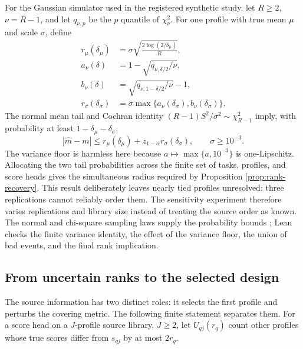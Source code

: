For the Gaussian simulator used in the registered synthetic study, let
$R\ge2$, $\nu=R-1$, and let $q_{\nu,p}$ be the $p$ quantile of
$\chi^2_\nu$.  For one profile with true mean $\mu$ and scale $\sigma$, define
\begin{align}
 r_\mu(\delta_\mu)
   &=\sigma\sqrt{\frac{2\log(2/\delta_\mu)}{R}},\\
 a_\nu(\delta)&=1-\sqrt{q_{\nu,\delta/2}/\nu},\\
 b_\nu(\delta)&=\sqrt{q_{\nu,1-\delta/2}/\nu}-1,\\
 r_\sigma(\delta_\sigma)
   &=\sigma\max\{a_\nu(\delta_\sigma),b_\nu(\delta_\sigma)\}.
\end{align}
The normal mean tail and Cochran identity
$(R-1)S^2/\sigma^2\sim\chi^2_{R-1}$ imply, with probability at least
$1-\delta_\mu-\delta_\sigma$,
\begin{equation}\label{eq:finite-source-margin}
 \left|\widehat m-m\right|
 \le r_\mu(\delta_\mu)+z_{1-\alpha}r_\sigma(\delta_\sigma),
 \qquad \sigma\ge10^{-3}.
\end{equation}
The variance floor is harmless here because $a\mapsto\max\{a,10^{-3}\}$ is
one-Lipschitz.  Allocating the two tail probabilities across the finite set of
tasks, profiles, and score heads gives the simultaneous radius required by
Proposition \ref{prop:rank-recovery}.  This result deliberately leaves nearly
tied profiles unresolved: three replications cannot reliably order them.  The
sensitivity experiment therefore varies replications and library size instead
of treating the source order as known.  The normal and chi-square sampling
laws supply the probability bounds \citep{Cochran1934}; Lean checks the finite
variance identity, the effect of the variance floor, the union of bad events,
and the final rank implication.

\subsection{From uncertain ranks to the selected design}

The source information has two distinct roles: it selects the first profile
and perturbs the covering metric.  The following finite statement separates
them.  For a score head on a $J$-profile source library, $J\ge2$, let
$U_{qj}(r_q)$ count other profiles whose true scores differ from $s_{qj}$ by
at most $2r_q$.

